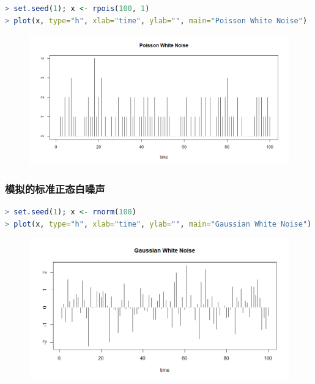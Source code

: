 \documentclass[11pt,a4paper,oneside]{book}
\begin{document}
\begin{lstlisting}[language=r]
> set.seed(1); x <- rpois(100, 1)
> plot(x, type="h", xlab="time", ylab="", main="Poisson White Noise")
\end{lstlisting}
\begin{figure}[H]
	\centering
	\includegraphics[width=\textwidth]{12.png}
\end{figure}
\subsubsection{模拟的标准正态白噪声}
\begin{lstlisting}[language=r]
> set.seed(1); x <- rnorm(100)
> plot(x, type="h", xlab="time", ylab="", main="Gaussian White Noise")
\end{lstlisting}
\begin{figure}[H]
	\centering
	\includegraphics[width=\textwidth]{13.png}
\end{figure}
\end{document}
